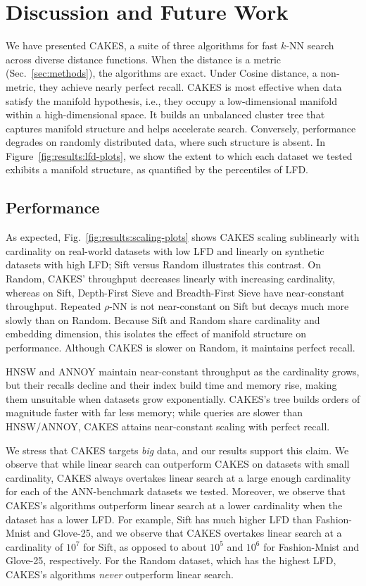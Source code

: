 \section{Discussion and Future Work}
\label{sec:discussion-and-future-work}

We have presented CAKES, a suite of three algorithms for fast $k$-NN search across diverse distance functions.
When the distance is a metric (Sec.~\ref{sec:methods}), the algorithms are exact.
Under Cosine distance, a non-metric, they achieve nearly perfect recall.
CAKES is most effective when data satisfy the manifold hypothesis, i.e., they occupy a low-dimensional manifold within a high-dimensional space. 
It builds an unbalanced cluster tree that captures manifold structure and helps accelerate search.
Conversely, performance degrades on randomly distributed data, where such structure is absent.
In Figure~\ref{fig:results:lfd-plots}, we show the extent to which each dataset we tested exhibits a manifold structure, as quantified by the percentiles of LFD.  


\subsection{Performance}

As expected, Fig.~\ref{fig:results:scaling-plots} shows CAKES scaling sublinearly with cardinality on real-world datasets with low LFD and linearly on synthetic datasets with high LFD;
Sift versus Random illustrates this contrast.
On Random, CAKES' throughput decreases linearly with increasing cardinality, whereas on Sift, Depth-First Sieve and Breadth-First Sieve have near-constant throughput.
Repeated $\rho$-NN is not near-constant on Sift but decays much more slowly than on Random.
Because Sift and Random share cardinality and embedding dimension, this isolates the effect of manifold structure on performance.
Although CAKES is slower on Random, it maintains perfect recall.

HNSW and ANNOY maintain near-constant throughput as the cardinality grows, but their recalls decline and their index build time and memory rise, making them unsuitable when datasets grow exponentially.
CAKES's tree builds orders of magnitude faster with far less memory; while queries are slower than HNSW/ANNOY, CAKES attains near-constant scaling with perfect recall.

We stress that CAKES targets \emph{big} data, and our results support this claim.
We observe that while linear search can outperform CAKES on datasets with small cardinality, CAKES always overtakes linear search at a large enough cardinality for each of the ANN-benchmark datasets we tested.
Moreover, we observe that CAKES's algorithms outperform linear search at a lower cardinality when the dataset has a lower LFD.
For example, Sift has much higher LFD than Fashion-Mnist and Glove-25, and we observe that CAKES overtakes linear search at a cardinality of $10^{7}$  for Sift, as opposed to about $10^{5}$ and $10^{6}$ for Fashion-Mnist and Glove-25, respectively.
For the Random dataset, which has the highest LFD, CAKES's algorithms \emph{never} outperform linear search.


